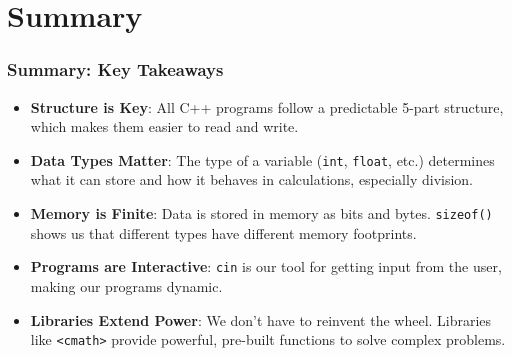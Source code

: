 \documentclass{beamer}
\begin{document}
\section{Summary}

\begin{frame}
\frametitle{Summary: Key Takeaways}
\begin{itemize}
    \item \textbf{Structure is Key}: All C++ programs follow a predictable 5-part structure, which makes them easier to read and write.
    \pause
    \item \textbf{Data Types Matter}: The type of a variable (\texttt{int}, \texttt{float}, etc.) determines what it can store and how it behaves in calculations, especially division.
    \pause
    \item \textbf{Memory is Finite}: Data is stored in memory as bits and bytes. \texttt{sizeof()} shows us that different types have different memory footprints.
    \pause
    \item \textbf{Programs are Interactive}: \texttt{cin} is our tool for getting input from the user, making our programs dynamic.
    \pause
    \item \textbf{Libraries Extend Power}: We don't have to reinvent the wheel. Libraries like \texttt{<cmath>} provide powerful, pre-built functions to solve complex problems.
\end{itemize}
\end{frame}
\end{document}
